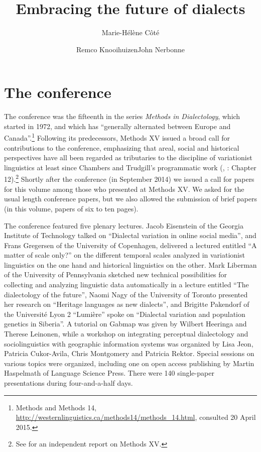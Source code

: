 \documentclass[output=paper]{LSP/langsci}
\author{Marie-Hélène Côté\affiliation{Université Laval}\and Remco Knooihuizen\affiliation{University of Groningen}\lastand John Nerbonne\affiliation{University of Groningen, University of Freiburg}}
\title{Embracing the future of dialects}
\begin{document}
% 


\section{The conference}
The conference was the fifteenth in the series \textit{Methods in Dialectology}, which started in 1972, and which has “generally alternated between Europe and Canada”.\footnote{Methods and Methods 14, \url{http://westernlinguistics.ca/methods14/methods_14.html}, consulted 20 April 2015.} Following its predecessors, Methods XV issued a broad call for contributions to the conference, emphasizing that areal, social and historical perspectives have all been regarded as tributaries to the discipline of variationist linguistics at least since Chambers and Trudgill’s programmatic work (\citealt{chambers_dialectology_1980}, \citealt{chambers_dialectology_1998}: Chapter 12).\footnote{See \citet{klein_2014} for an independent report on Methods XV.} Shortly after the conference (in September 2014) we issued a call for papers for this volume among those who presented at Methods XV. We asked for the usual length conference papers, but we also allowed the submission of brief papers (in this volume, papers of six to ten pages).

The conference featured five plenary lectures. Jacob Eisenstein of the Georgia Institute of Technology talked on “Dialectal variation in online social media”, and Frans Gregersen of  the University of Copenhagen, delivered a lectured entitled “A matter of scale only?” on the different temporal scales analyzed in variationist linguistics on the one hand and historical linguistics on the other. Mark Liberman of the University of Pennsylvania sketched new technical possibilities for collecting and analyzing linguistic data automatically in a lecture entitled “The dialectology of the future”, Naomi Nagy of the University of Toronto presented her research on “Heritage languages as new dialects”, and Brigitte Pakendorf of the Université Lyon 2 “Lumière” spoke on “Dialectal variation and population genetics in Siberia”.  A tutorial on Gabmap \citep{nerbonne_gabmap_2011} was given by Wilbert Heeringa and Therese Leinonen, while a workshop on integrating perceptual dialectology and sociolinguistics with geographic information systems was organized by Lisa Jeon, Patricia Cukor-Avila, Chris Montgomery and Patricia Rektor. Special sessions on various topics were organized, including one on open access publishing by Martin Haspelmath of Language Science Press.  There were 140 single-paper presentations during four-and-a-half days.
\end{document}
